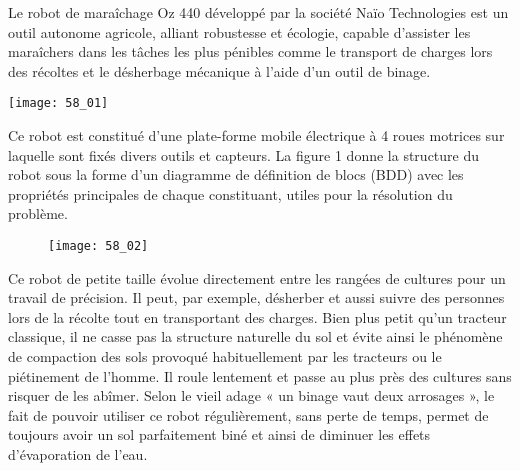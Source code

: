 \normaltrue \difficilefalse \tdifficilefalse
\correctiontrue

\setcounter{question}{0}

\ifcorrection
\else
{}
\fi

\ifprof
\else

Le robot de maraîchage Oz 440 développé par la société Naïo Technologies est un outil autonome
agricole, alliant robustesse et écologie, capable d’assister les maraîchers dans les tâches les plus
pénibles comme le transport de charges lors des récoltes et le désherbage mécanique à l’aide d’un
outil de binage.


\begin{marginfigure}[5cm]
\centering
\texttt{[image: 58\_01]}
\end{marginfigure}


Ce robot est constitué d’une plate-forme mobile électrique à 4 roues motrices sur laquelle sont
fixés divers outils et capteurs. La figure 1 donne la structure du robot sous la forme d’un
diagramme de définition de blocs (BDD) avec les propriétés principales de chaque constituant,
utiles pour la résolution du problème.

\begin{figure}[H]
\centering
\texttt{[image: 58\_02]}
\end{figure}


Ce robot de petite taille évolue directement entre les rangées de cultures pour un travail de
précision. Il peut, par exemple, désherber et aussi suivre des personnes lors de la récolte tout en
transportant des charges. Bien plus petit qu’un tracteur classique, il ne casse pas la structure
naturelle du sol et évite ainsi le phénomène de compaction des sols provoqué habituellement par les
tracteurs ou le piétinement de l’homme. Il roule lentement et passe au plus près des cultures sans
risquer de les abîmer. Selon le vieil adage « un binage vaut deux arrosages », le fait de pouvoir
utiliser ce robot régulièrement, sans perte de temps, permet de toujours avoir un sol parfaitement
biné et ainsi de diminuer les effets d’évaporation de l’eau.
\fi

